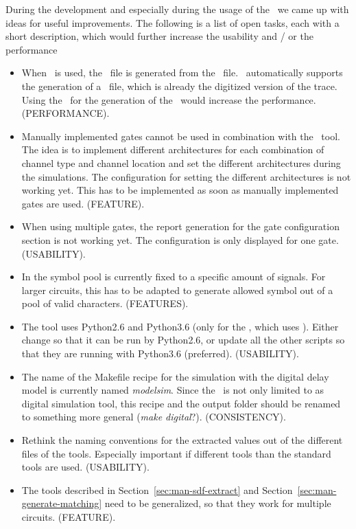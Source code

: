 During the development and especially during the usage of the \invt\, we came 
up with ideas for useful improvements. 
The following is a list of open tasks, each with a short description, which 
would further increase the usability and / or the performance

\begin{itemize}
	\item When \hspice\ is used, the \crossingsjson\ file is 
	generated from the \trfile\ file. \hspice\ automatically supports the 
	generation of a \vcdfile\ file, which is already the digitized version of 
	the trace. Using the \vcdfile\ for the generation of the \crossingsjson\ 
	would increase the performance. (PERFORMANCE).
	
	\item Manually implemented gates cannot be used in combination with the 
	\multiexec\ tool. The idea is to implement different architectures for 
	each combination of channel type and channel location and set the 
	different architectures during the simulations. The configuration for 
	setting the different architectures is not working yet. This has to be 
	implemented as soon as manually implemented gates are used. (FEATURE).
	
	\item When using multiple gates, the report generation for the gate 
	configuration section is not working yet. The configuration is only 
	displayed for one gate. (USABILITY).
	
	\item In  the symbol pool is currently fixed to a specific 
	amount of signals. For larger circuits, this has to be adapted to generate 
	allowed symbol out of a pool of valid characters. (FEATURES).
	
	\item The tool uses Python2.6 and Python3.6 (only for the , 
	which uses ). Either change \file{rawread.py} so that it 
	can be run by Python2.6, or update all the other scripts so that they are 
	running with Python3.6 (preferred). (USABILITY).
	
	\item The name of the Makefile recipe for the simulation with the digital 
	delay model is currently named \emph{modelsim}. Since the \invt\ is not 
	only limited to \modelsim as digital simulation tool, this recipe and the 
	output folder should be renamed to something more general (\emph{make 
	digital}?). (CONSISTENCY).

	\item Rethink the naming conventions for the extracted values out of the 
	different files of the tools. Especially important if different tools than 
	the standard tools are used. (USABILITY).
	
	\item The tools described in Section~\ref{sec:man-sdf-extract} and 
	Section~\ref{sec:man-generate-matching} need to be generalized, so that 
	they work for multiple circuits. (FEATURE).
\end{itemize}

